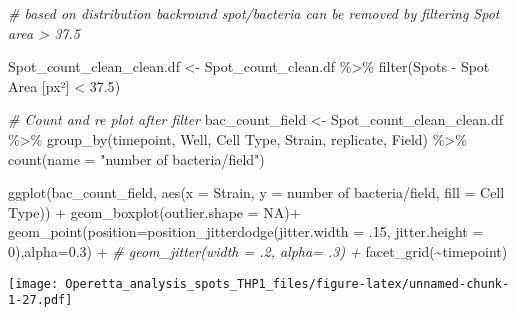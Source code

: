 \documentclass[
]{article}
\newenvironment{Shaded}{\begin{snugshade}}{\end{snugshade}}
\newcommand{\AttributeTok}[1]{\textcolor[rgb]{0.77,0.63,0.00}{#1}}
\newcommand{\CommentTok}[1]{\textcolor[rgb]{0.56,0.35,0.01}{\textit{#1}}}
\newcommand{\ConstantTok}[1]{\textcolor[rgb]{0.00,0.00,0.00}{#1}}
\newcommand{\DecValTok}[1]{\textcolor[rgb]{0.00,0.00,0.81}{#1}}
\newcommand{\FloatTok}[1]{\textcolor[rgb]{0.00,0.00,0.81}{#1}}
\newcommand{\FunctionTok}[1]{\textcolor[rgb]{0.00,0.00,0.00}{#1}}
\newcommand{\NormalTok}[1]{#1}
\newcommand{\OtherTok}[1]{\textcolor[rgb]{0.56,0.35,0.01}{#1}}
\newcommand{\SpecialCharTok}[1]{\textcolor[rgb]{0.00,0.00,0.00}{#1}}
\newcommand{\StringTok}[1]{\textcolor[rgb]{0.31,0.60,0.02}{#1}}
\begin{document}
\begin{Shaded}
\begin{Highlighting}[]
\CommentTok{\# based on distribution backround spot/bacteria can be removed by filtering Spot area \textgreater{} 37.5}

\NormalTok{Spot\_count\_clean\_clean.df }\OtherTok{\textless{}{-}}\NormalTok{  Spot\_count\_clean.df }\SpecialCharTok{\%\textgreater{}\%}
  \FunctionTok{filter}\NormalTok{(}\StringTok{\textasciigrave{}}\AttributeTok{Spots {-} Spot Area [px²]}\StringTok{\textasciigrave{}} \SpecialCharTok{\textless{}} \FloatTok{37.5}\NormalTok{)}

\CommentTok{\# Count and re plot after filter}
\NormalTok{bac\_count\_field }\OtherTok{\textless{}{-}}\NormalTok{ Spot\_count\_clean\_clean.df  }\SpecialCharTok{\%\textgreater{}\%} \FunctionTok{group\_by}\NormalTok{(timepoint,  Well, }\StringTok{\textasciigrave{}}\AttributeTok{Cell Type}\StringTok{\textasciigrave{}}\NormalTok{, Strain, replicate, Field) }\SpecialCharTok{\%\textgreater{}\%}
  \FunctionTok{count}\NormalTok{(}\AttributeTok{name =} \StringTok{"number of bacteria/field"}\NormalTok{)}

\FunctionTok{ggplot}\NormalTok{(bac\_count\_field, }\FunctionTok{aes}\NormalTok{(}\AttributeTok{x =}\NormalTok{ Strain, }\AttributeTok{y =} \StringTok{\textasciigrave{}}\AttributeTok{number of bacteria/field}\StringTok{\textasciigrave{}}\NormalTok{, }\AttributeTok{fill =} \StringTok{\textasciigrave{}}\AttributeTok{Cell Type}\StringTok{\textasciigrave{}}\NormalTok{)) }\SpecialCharTok{+}
  \FunctionTok{geom\_boxplot}\NormalTok{(}\AttributeTok{outlier.shape =} \ConstantTok{NA}\NormalTok{)}\SpecialCharTok{+}
  \FunctionTok{geom\_point}\NormalTok{(}\AttributeTok{position=}\FunctionTok{position\_jitterdodge}\NormalTok{(}\AttributeTok{jitter.width =}\NormalTok{ .}\DecValTok{15}\NormalTok{, }\AttributeTok{jitter.height =} \DecValTok{0}\NormalTok{),}\AttributeTok{alpha=}\FloatTok{0.3}\NormalTok{) }\SpecialCharTok{+}
  \CommentTok{\#  geom\_jitter(width = .2, alpha= .3) +}
  \FunctionTok{facet\_grid}\NormalTok{(}\SpecialCharTok{\textasciitilde{}}\NormalTok{timepoint)}
\end{Highlighting}
\end{Shaded}

\texttt{[image: Operetta\_analysis\_spots\_THP1\_files/figure-latex/unnamed-chunk-1-27.pdf]}
\end{document}
